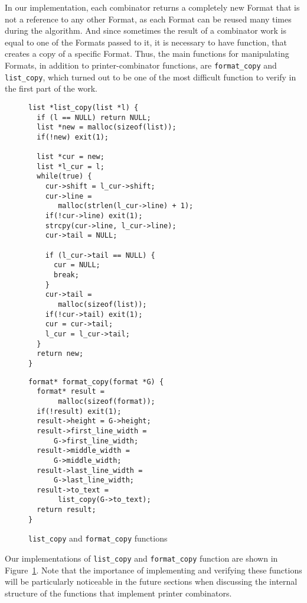 \documentclass[14pt]{constructor-diploma}
\begin{document}
In our implementation, each combinator returns a completely new Format that is not a reference to any other Format, 
as each Format can be reused many times during the algorithm. And since sometimes the result of a combinator work 
is equal to one of the Formats passed to it, it is necessary to have function, that creates a copy of a specific Format. 
Thus, the main functions for manipulating Formats, in addition to printer-combinator functions, are
\texttt{format\_copy} and \texttt{list\_copy}, which turned out to be one of the most difficult function to verify in the first part of the work.
\begin{figure}[H]
\begin{minipage}{0.55\textwidth}

\begin{mdframed}[backgroundcolor=bg]
\begin{verbatim}
list *list_copy(list *l) {
  if (l == NULL) return NULL;
  list *new = malloc(sizeof(list));
  if(!new) exit(1);

  list *cur = new;
  list *l_cur = l;
  while(true) {
    cur->shift = l_cur->shift;
    cur->line =
       malloc(strlen(l_cur->line) + 1);
    if(!cur->line) exit(1);
    strcpy(cur->line, l_cur->line);
    cur->tail = NULL;

    if (l_cur->tail == NULL) {
      cur = NULL;
      break;
    }
    cur->tail =
       malloc(sizeof(list));
    if(!cur->tail) exit(1);
    cur = cur->tail;
    l_cur = l_cur->tail;
  }
  return new;
}
\end{verbatim}
\end{mdframed}
\vspace*{-210pt}
\end{minipage}
\begin{minipage}{0.46\textwidth}

\begin{mdframed}[backgroundcolor=bg]
\begin{verbatim}
format* format_copy(format *G) {
  format* result =
       malloc(sizeof(format));
  if(!result) exit(1);
  result->height = G->height;
  result->first_line_width = 
      G->first_line_width;
  result->middle_width = 
      G->middle_width;
  result->last_line_width = 
      G->last_line_width;
  result->to_text =
       list_copy(G->to_text);
  return result;
}
\end{verbatim}
\end{mdframed}
\end{minipage}
\vspace*{210pt}
\caption{\texttt{list\_copy} and \texttt{format\_copy} functions}
\label{fig:format_copy}
\end{figure}
Our implementations of \texttt{list\_copy} and \texttt{format\_copy} function are shown in Figure~\ref{fig:format_copy}.
Note that the importance of implementing and verifying these functions will be particularly noticeable in the future sections
when discussing the internal structure of the functions that implement printer combinators.
\end{document}
